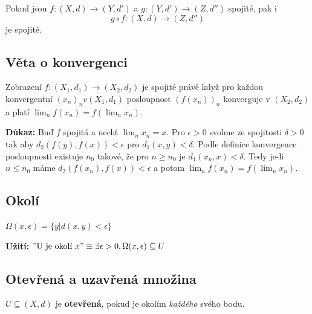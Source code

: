 \documentclass[../main.tex]{subfiles}
\begin{document}
\hspace{1.2mm}
Pokud jsou $f: (X,d) \to (Y, d')$ a $g: (Y,d') \to (Z, d'')$ spojité, pak i
\[ g \circ f: (X,d) \to (Z,d'') \] je spojité.

\subsection{Věta o konvergenci}
\hspace{1.2mm}
Zobrazení $f: (X_1,d_1) \rightarrow (X_2,d_2)$ je spojité právě když pro každou konvergentní $(x_n)_n v (X_1,d_1)$ 
posloupnost $(f(x_n))_n$ konverguje v $(X_2,d_2)$ a platí $\lim_n f(x_n) = f(\lim_n x_n)$.

\noindent
\hspace{1.2mm}
\textbf{Důkaz:}
Buď $f$ spojitá a nechť $\lim_nx_n = x$. Pro $\epsilon > 0$ svolme ze spojitosti $\delta > 0$
tak aby $d_2(f(y),f(x)) <\epsilon$ pro $d_1(x,y) < \delta$.
Podle definice konvergence posloupnosti existuje $n_0$ takové, že pro $n\geq n_0$ je $d_1(x_n,x) < \delta$. Tedy je-li $n \leq n_0$
máme $d_2(f(x_n),f(x)) < \epsilon$ a potom $\lim_n f(x_n) = f(\lim_n x_n)$.


\subsection{Okolí}
\hspace{1.2mm}
$\Omega (x,\epsilon) = \{ y | d(x,y) < \epsilon \}$

\vspace{5mm}

\noindent
\hspace{1.2mm}
\textbf{Užití:}
$"\textrm{U je okolí } x" \equiv \exists \epsilon > 0, \Omega (x,\epsilon) \subseteq U $

\subsection{Otevřená a uzavřená množina}
\hspace{1.2mm}
$U \subseteq (X,d)$ je \textbf{otevřená}, pokud je okolím \textit{každého} svého bodu.

\vspace{5mm}
\end{document}
